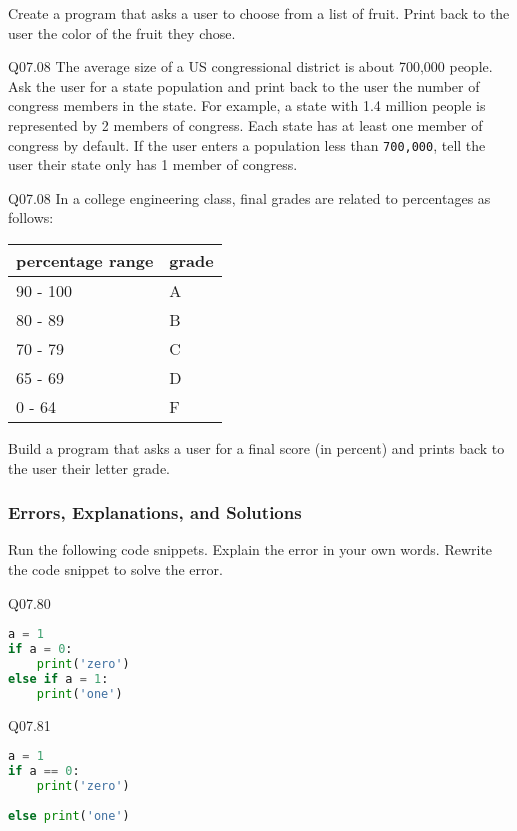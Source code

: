 \documentclass{book}
\newenvironment{problems}{}{}  %
\newcommand{\passthrough}[1]{#1}
\begin{document}
\begin{problems}
Create a program that asks a user to choose from a list of fruit. Print
back to the user the color of the fruit they chose.

Q07.08 The average size of a US congressional district is about 700,000
people. Ask the user for a state population and print back to the user
the number of congress members in the state. For example, a state with
1.4 million people is represented by 2 members of congress. Each state
has at least one member of congress by default. If the user enters a
population less than \passthrough{\lstinline!700,000!}, tell the user
their state only has 1 member of congress.

Q07.08 In a college engineering class, final grades are related to
percentages as follows:

\begin{longtable}[]{@{}ll@{}}
\toprule
percentage range & grade\tabularnewline
\midrule
\endhead
90 - 100 & A\tabularnewline
80 - 89 & B\tabularnewline
70 - 79 & C\tabularnewline
65 - 69 & D\tabularnewline
0 - 64 & F\tabularnewline
\bottomrule
\end{longtable}

Build a program that asks a user for a final score (in percent) and
prints back to the user their letter grade.
        \end{problems}

    




    
        \hypertarget{errors-explanations-and-solutions}{%
\subsubsection{Errors, Explanations, and
Solutions}\label{errors-explanations-and-solutions}}

Run the following code snippets. Explain the error in your own words.
Rewrite the code snippet to solve the error.
    




    
        Q07.80

\begin{lstlisting}[language=Python]
a = 1
if a = 0:
    print('zero')
else if a = 1:
    print('one')
\end{lstlisting}
    




    
        Q07.81

\begin{lstlisting}[language=Python]
a = 1
if a == 0:
    print('zero')
    
else print('one')
\end{lstlisting}
    
\end{document}
